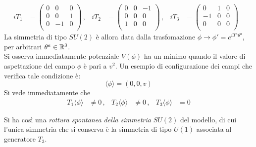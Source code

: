 \begin{equation}
   \begin{aligned}
      i T_1 & = \begin{pmatrix}
                   0  & 0  & 0 \\
                   0  & 0  & 1 \\
                   0  & -1 & 0 \\
                 \end{pmatrix} \, , &
      i T_2 & = \begin{pmatrix}
                   0  & 0  & -1 \\
                   0  & 0  & 0 \\
                   1  & 0  & 0 \\
                 \end{pmatrix} \, , &
      i T_3 & = \begin{pmatrix}
                   0  & 1  & 0 \\
                   -1 & 0  & 0 \\
                   0  & 0  & 0 \\
                \end{pmatrix} &
   \end{aligned}
\end{equation}
La simmetria di tipo $SU(2)$ è allora data dalla trasfomazione
$\phi \to \phi' = e^{iT^a\theta^a}$, per arbitrari $\theta^a \in \mathbb{R} ^3 $.\\

Si osserva immediatamente potenziale $V(\phi)$ ha un minimo quando il valore di
aspettazione del campo $\phi$ è pari a $v^2$. Un esempio di configurazione dei
campi che verifica tale condizione è:
   $$ \langle \phi \rangle = (0,0,v) $$
Si vede immediatamente che
\begin{equation}
   \begin{aligned}
      T_1 \langle \phi \rangle & \neq 0 \, , &
      T_2 \langle \phi \rangle & \neq 0 \, , &
      T_3 \langle \phi \rangle & = 0
   \end{aligned}
\end{equation}

Si ha così una \emph{rottura spontanea della simmetria} $SU(2)$ del modello, di cui l'unica
simmetria che si conserva è la simmetria di tipo $U(1)$ associata al generatore $T_3$.\\
